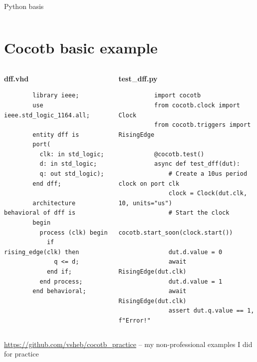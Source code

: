 \documentclass[aspectratio=169]{beamer}
\begin{document}
\begin{frame}{\secname}
\begin{columns}[c]
\begin{column}{0.55\textwidth}
\begin{exampleblock}{Python basis }
       \end{exampleblock}
    \end{column}
  \end{columns}
   
\end{frame}


\section*{Cocotb basic example}
\begin{frame}[fragile]{\secname}

  \begin{columns}[t]
    \scriptsize
    \begin{column}{0.4\textwidth}
      \centering 
      {\bf dff.vhd}
      
      \begin{verbatim}
        library ieee;
        use ieee.std_logic_1164.all;
         
        entity dff is
        port(
          clk: in std_logic;
          d: in std_logic;
          q: out std_logic);
        end dff;
         
        architecture behavioral of dff is
        begin
          process (clk) begin
            if rising_edge(clk) then
              q <= d;
            end if;
          end process;
        end behavioral;

      \end{verbatim}
      
    \end{column}
    \begin{column}{0.7\textwidth}
      \centering 
      {\bf test$\rm\_$dff.py}
        \begin{verbatim}
          import cocotb   
          from cocotb.clock import Clock
          from cocotb.triggers import RisingEdge
                          
          @cocotb.test() 
          async def test_dff(dut):
              # Create a 10us period clock on port clk
              clock = Clock(dut.clk, 10, units="us")  
              # Start the clock
              cocotb.start_soon(clock.start())  
                          
              dut.d.value = 0  
              await RisingEdge(dut.clk)  
              dut.d.value = 1  
              await RisingEdge(dut.clk)
              assert dut.q.value == 1, f"Error!"

        \end{verbatim}
      
    \end{column}

  \end{columns}


  {\color{blue} \url{https://github.com/vsheb/cocotb_practice}} -- my non-professional examples I did for practice
\end{frame}
\end{document}
